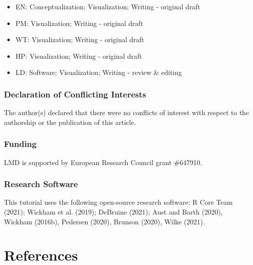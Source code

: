 \documentclass[
  english,
  doc,floatsintext]{apa6}
\providecommand{\tightlist}{%
  \setlength{\itemsep}{0pt}\setlength{\parskip}{0pt}}
\begin{document}
\begin{itemize}
\tightlist
\item
  EN: Conceptualization; Visualization; Writing - original draft
\item
  PM: Visualization; Writing - original draft
\item
  WT: Visualization; Writing - original draft
\item
  HP: Visualization; Writing - original draft
\item
  LD: Software; Visualization; Writing - review \& editing
\end{itemize}

\hypertarget{declaration-of-conflicting-interests}{%
\subsubsection{Declaration of Conflicting Interests}\label{declaration-of-conflicting-interests}}

The author(s) declared that there were no conflicts of interest with respect to the authorship or the publication of this article.

\hypertarget{funding}{%
\subsubsection{Funding}\label{funding}}

LMD is supported by European Research Council grant \#647910.

\hypertarget{research-software}{%
\subsubsection{Research Software}\label{research-software}}

This tutorial uses the following open-source research software: R Core Team (2021); Wickham et al. (2019); DeBruine (2021); Aust and Barth (2020), Wickham (2016b), Pedersen (2020), Brunson (2020), Wilke (2021).

\newpage

\hypertarget{references}{%
\section{References}\label{references}}

\begingroup
\setlength{\parindent}{-0.5in}
\setlength{\leftskip}{0.5in}
\end{document}
